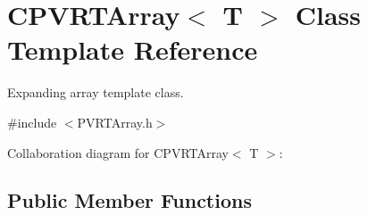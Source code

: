 \hypertarget{class_c_p_v_r_t_array}{\section{C\+P\+V\+R\+T\+Array$<$ T $>$ Class Template Reference}
\label{class_c_p_v_r_t_array}
}


Expanding array template class.  




{\ttfamily \#include $<$P\+V\+R\+T\+Array.\+h$>$}



Collaboration diagram for C\+P\+V\+R\+T\+Array$<$ T $>$\+:
\subsection*{Public Member Functions}
